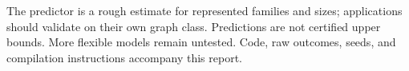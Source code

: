 \documentclass{article}
\begin{document}
The predictor is a rough estimate for represented families and sizes;
applications should validate on their own graph class. Predictions are
not certified upper bounds. More flexible models remain untested.
Code, raw outcomes, seeds, and compilation instructions accompany this report.



\end{document}
